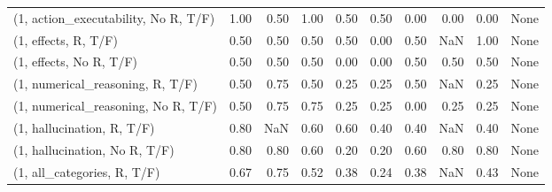 \begin{table*}[h!]
\begin{adjustbox}{width=2\columnwidth,center}
\begin{tabular}{lrrr|rrr|rrr}
(1, action\_executability, No R, T/F) &                      1.00 &                  0.50 &                      1.00 &                          0.50 &                      0.50 &                          0.00 &                                   0.00 &                               0.00 &                                  None \\
(1, effects, R, T/F)                 &                      0.50 &                  0.50 &                      0.50 &                          0.50 &                      0.00 &                          0.50 &                                    NaN &                               1.00 &                                  None \\
(1, effects, No R, T/F)              &                      0.50 &                  0.50 &                      0.50 &                          0.00 &                      0.00 &                          0.50 &                                   0.50 &                               0.50 &                                  None \\
(1, numerical\_reasoning, R, T/F)     &                      0.50 &                  0.75 &                      0.50 &                          0.25 &                      0.25 &                          0.50 &                                    NaN &                               0.25 &                                  None \\
(1, numerical\_reasoning, No R, T/F)  &                      0.50 &                  0.75 &                      0.75 &                          0.25 &                      0.25 &                          0.00 &                                   0.25 &                               0.25 &                                  None \\
(1, hallucination, R, T/F)           &                      0.80 &                   NaN &                      0.60 &                          0.60 &                      0.40 &                          0.40 &                                    NaN &                               0.40 &                                  None \\
(1, hallucination, No R, T/F)        &                      0.80 &                  0.80 &                      0.60 &                          0.20 &                      0.20 &                          0.60 &                                   0.80 &                               0.80 &                                  None \\
(1, all\_categories, R, T/F)          &                      0.67 &                  0.75 &                      0.52 &                          0.38 &                      0.24 &                          0.38 &                                    NaN &                               0.43 &                                  None \\

\end{tabular}
\end{adjustbox}
\end{table*}
